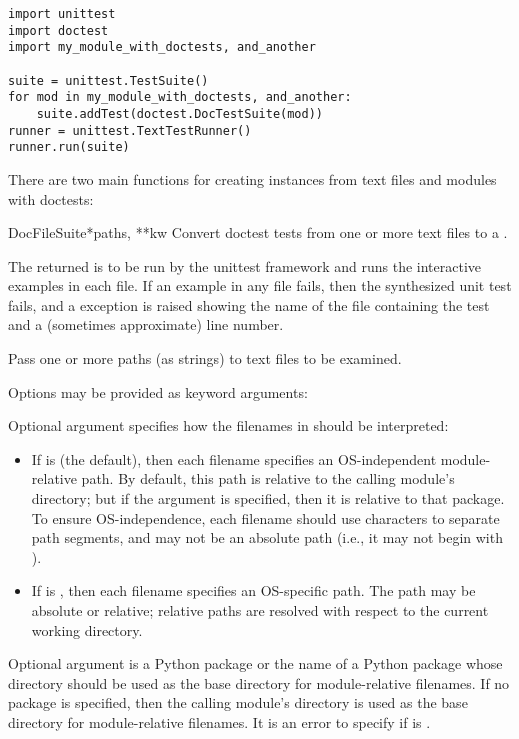 \begin{verbatim}
import unittest
import doctest
import my_module_with_doctests, and_another

suite = unittest.TestSuite()
for mod in my_module_with_doctests, and_another:
    suite.addTest(doctest.DocTestSuite(mod))
runner = unittest.TextTestRunner()
runner.run(suite)
\end{verbatim}

There are two main functions for creating 
instances from text files and modules with doctests:

\begin{funcdesc}{DocFileSuite}{*paths, **kw}
  Convert doctest tests from one or more text files to a
  .

  The returned  is to be run by the
  unittest framework and runs the interactive examples in each file.  If an
  example in any file fails, then the synthesized unit test fails, and a
   exception is raised showing the name of the
  file containing the test and a (sometimes approximate) line number.

  Pass one or more paths (as strings) to text files to be examined.

  Options may be provided as keyword arguments:

  Optional argument  specifies how
  the filenames in  should be interpreted:

  \begin{itemize}
  \item If  is  (the default), then
        each filename specifies an OS-independent module-relative
        path.  By default, this path is relative to the calling
        module's directory; but if the  argument is
        specified, then it is relative to that package.  To ensure
        OS-independence, each filename should use \code{/} characters
        to separate path segments, and may not be an absolute path
        (i.e., it may not begin with \code{/}).
  \item If  is , then each filename
        specifies an OS-specific path.  The path may be absolute or
        relative; relative paths are resolved with respect to the
        current working directory.
  \end{itemize}

  Optional argument  is a Python package or the name
  of a Python package whose directory should be used as the base
  directory for module-relative filenames.  If no package is
  specified, then the calling module's directory is used as the base
  directory for module-relative filenames.  It is an error to specify
   if  is .


\end{funcdesc}

